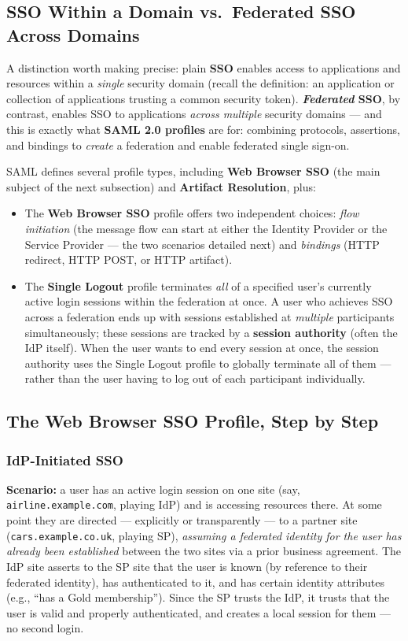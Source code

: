 \documentclass[12pt, a4paper]{article}
\begin{document}
\subsection{SSO Within a Domain vs.\ Federated SSO Across Domains}
\label{subsec:saml-sso-federated-06}
A distinction worth making precise: plain \textbf{SSO} enables access to applications and resources within a \emph{single} security domain (recall the definition: an application or collection of applications trusting a common security token). \textcolor{red!70!black}{\textbf{\emph{Federated} SSO}}, by contrast, enables SSO to applications \emph{across multiple} security domains --- and this is exactly what \textbf{SAML 2.0 profiles} are for: combining protocols, assertions, and bindings to \emph{create} a federation and enable federated single sign-on.

SAML defines several profile types, including \textbf{Web Browser SSO} (the main subject of the next subsection) and \textbf{Artifact Resolution}, plus:
\begin{itemize}
    \item The \textbf{Web Browser SSO} profile offers two independent choices: \emph{flow initiation} (the message flow can start at either the Identity Provider or the Service Provider --- the two scenarios detailed next) and \emph{bindings} (HTTP redirect, HTTP POST, or HTTP artifact).
    \item The \textbf{Single Logout} profile terminates \emph{all} of a specified user's currently active login sessions within the federation at once. A user who achieves SSO across a federation ends up with sessions established at \emph{multiple} participants simultaneously; these sessions are tracked by a \textbf{session authority} (often the IdP itself). When the user wants to end every session at once, the session authority uses the Single Logout profile to globally terminate all of them --- rather than the user having to log out of each participant individually.
\end{itemize}

\subsection{The Web Browser SSO Profile, Step by Step}
\label{subsec:saml-websso-06}

\subsubsection{IdP-Initiated SSO}
\textbf{Scenario:} a user has an active login session on one site (say, \texttt{airline.example.com}, playing IdP) and is accessing resources there. At some point they are directed --- explicitly or transparently --- to a partner site (\texttt{cars.example.co.uk}, playing SP), \emph{assuming a federated identity for the user has already been established} between the two sites via a prior business agreement. The IdP site asserts to the SP site that the user is known (by reference to their federated identity), has authenticated to it, and has certain identity attributes (e.g., ``has a Gold membership''). Since the SP trusts the IdP, it trusts that the user is valid and properly authenticated, and creates a local session for them --- no second login.
\end{document}
